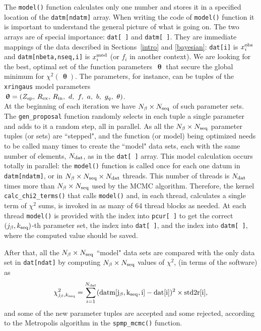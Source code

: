 \documentclass[preprint2]{aastex}
\newcommand{\bfth}{\,\bm{\uptheta}}
\newcommand{\rex}{\, R_\mathrm{ex}}
\newcommand{\rin}{\, R_\mathrm{in}}
\begin{document}
The \verb|model()| function calculates only one 
number and stores it in a specified location of the \verb|datm[ndatm]| array. 
When writing the code of \verb|model()| function it is important to understand
the general picture of what is going on. The two arrays are of special importance: 
\verb|dat[ ]| and \verb|datm[ ]|. They are immediate mappings of the data 
described in Sections~\ref{intro} and \ref{bayesian}: \verb|dat[i]| is $x_i^{\rm obs}$ and 
\verb|datm[nbeta,nseq,i]| is $x_i^{\rm mod}$ (or $f_i$ in another context).
We are looking for the best, optimal set of the function parameters $\bfth$ that secure 
the global minimum for $\chi^2(\bfth)$.
The parameters, for instance, can be tuples of the \verb|xringaus| model parameters \\
$\bfth = (Z_{\rm sp}, \rex, \rin, \ d, \ f, \ a, \ b, \ g_q, \ \theta)$. \\  
At the beginning of each iteration we have $N_\beta \times N_{\rm seq}$ of such 
parameter sets. The \verb|gen_proposal| function randomly selects in each tuple
a single parameter and adds to it a random step, all in parallel. As all 
the $N_\beta \times N_{\rm seq}$ parameter tuples (or sets) are ``stepped", and 
the function (or model) being optimized needs to be called many times to create the
``model" data sets, each with the same number of elements, $N_{\rm dat}$, as 
in the \verb|dat[ ]| array. This model calculation occurs totally in parallel:
the \verb|model()| function is called once for each one datum in \verb|datm[ndatm]|,
or in $N_\beta \times N_{\rm seq} \times N_{\rm dat}$ threads. This number of
threads is $N_{\rm dat}$ times more than $N_\beta \times N_{\rm seq} $ used by 
the MCMC algorithm. Therefore, the kernel \verb|calc_chi2_terms()| that calls 
\verb|model()| and, in each thread, calculates a single term of $\chi^2$ sums,
is invoked in as many of 64 thread blocks as needed. At each thread
\verb|model()| is provided with the index into \verb|pcur[ ]| to get the correct
$(j_\beta,k_{\rm seq})$-th 
parameter set, the index into \verb|dat[ ]|, and the index into \verb|datm[ ]|, 
where the computed value should be saved.

After that, all the $N_\beta \times N_{\rm seq}$ ``model" data sets are
compared with the only data set in \verb|dat[ndat]| by computing 
$N_\beta \times N_{\rm seq}$ values of $\chi^2$, (in terms of the software) as 
\begin{equation} \label{chi2_soft}
  \chi^2_{j_\beta,k_{\rm seq}} = \sum_{i=1}^{N_{\rm dat}} 
     ({\rm datm[j_\beta,k_{\rm seq},i]} - {\rm dat[i]})^2 \times {\rm std2r[i]},
\end{equation}
and some of the new parameter tuples are accepted and some rejected, according 
to the Metropolis algorithm in the \verb|spmp_mcmc()| function. 
\end{document}
